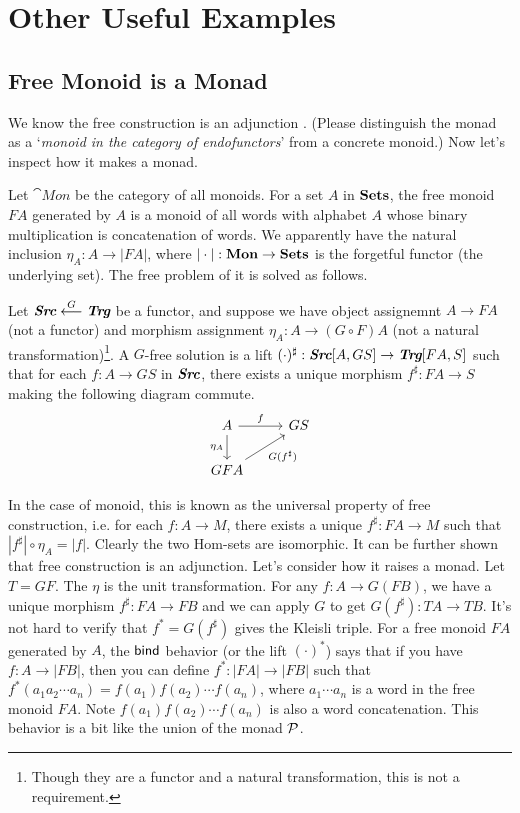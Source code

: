 \chapter{Other Useful Examples}
\label{monad-examples}

\newcommand{\Mon}{\cat{Mon}}

\section{Free Monoid is a Monad}
We know the free construction is an adjunction \cite{simmons2011introduction}.
(Please distinguish the monad as a `{\it monoid in the category of
endofunctors}' from a concrete monoid.)
Now let's inspect how it makes a monad. 

Let $\Mon$ be the category of all monoids. For a set $A$ in $\mathbf{Sets}$, the 
free monoid $FA$ generated by $A$ is a monoid of all words with alphabet 
$A$ whose binary multiplication is concatenation of words. We apparently 
have the natural inclusion $\eta_A:A\to |FA|$, where 
$|\cdot|:\Mon\to\Sets$ is the forgetful functor (the underlying set).
The free problem of it is solved as follows. 

\begin{definition}
    Let $\textbf{\em Src}\overset{G}{\longleftarrow}\textbf{\em Trg}$ be a functor, and suppose
    we have object assignemnt $A\to FA$ (not a functor) and morphism 
    assignment $\eta_A: A\to (G\circ F)A$ (not a natural 
    transformation)\footnote{Though they are a functor and a natural transformation,
    this is not a requirement.}.
    A $G$-free solution is a lift $(\cdot)^\sharp: \textbf{\em Src}[A,GS]\to
    \textbf{\em Trg}[FA, S]$ such that for each $f:A\to GS$ in $\textbf{\em Src}$, there exists
    a unique morphism $f^\sharp:FA\to S$ making the following diagram
    commute.
    $$
    \begin{tikzcd}
        A \arrow{r}{f} \arrow[swap]{d}{\eta_A} & GS \\
        GFA \arrow[swap]{ru}{G(f^\sharp)} &
    \end{tikzcd}
    $$
\end{definition}

In the case of monoid, this is known as the universal property of free
construction, i.e. for each $f:A\to M$, there exists a unique 
$f^\sharp:FA\to M$ such that $|f^\sharp|\circ \eta_A=|f|$. 
Clearly the two Hom-sets are isomorphic. It can be further shown that
free construction is an adjunction. Let's consider how it raises a
monad. Let $T=GF$. The $\eta$ is the unit transformation. For any 
$f:A\to G(FB)$, we have a unique morphism $f^\sharp: FA\to FB$ and
we can apply $G$ to get $G(f^\sharp): TA\to TB$. It's not hard to 
verify that $f^\ast=G(f^\sharp)$ gives the Kleisli triple.
For a free monoid $FA$ generated by $A$, the $\text{\sf bind}$ behavior (or
the lift $(\cdot)^\ast$) says that if you have $f:A\to |FB|$, then
you can define $f^\ast:|FA|\to |FB|$ such that $f^\ast(a_1a_2\cdots a_n)
=f(a_1)f(a_2)\cdots f(a_n)$, where $a_1\cdots a_n$ is a word in the
free monoid $FA$. Note $f(a_1)f(a_2)\cdots f(a_n)$ is also a word
concatenation. This behavior is a bit like the union of the monad 
$\mathcal{P}$.

